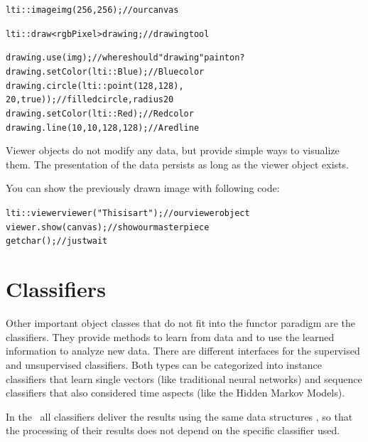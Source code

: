 {\small
\begin{alltt}
  lti::image img(256,256);  // our canvas

  lti::draw<rgbPixel> drawing;  // drawing tool
  
  drawing.use(img);                      // where should "drawing" paint on?
  drawing.setColor(lti::Blue);           // Blue color
  drawing.circle(lti::point(128,128),
              20,true));              // filled circle, radius 20
  drawing.setColor(lti::Red);            // Red color
  drawing.line(10,10,128,128);           // A red line
\end{alltt}
}

Viewer objects do not modify any data, but provide simple ways to
visualize them.  The presentation of the data persists as long as the viewer
object exists.

You can show the previously drawn image with following code:

{\small
\begin{alltt}
  lti::viewer viewer("This is art");  // our viewer object
  viewer.show(canvas);                // show our master piece
  getchar();                          // just wait 
\end{alltt}
}

\section{Classifiers}

Other important object classes that do not fit into the functor paradigm are
the classifiers.  They provide methods to learn from data and to use the
learned information to analyze new data.  There are different interfaces for
the supervised and unsupervised classifiers.  Both types can be categorized
into instance classifiers that learn single vectors (like traditional neural
networks) and sequence classifiers that also considered time aspects (like the
Hidden Markov Models).

In the \ltilib\ all classifiers deliver the results using the same data
structures , so that the processing of
their results does not depend on the specific classifier used.

